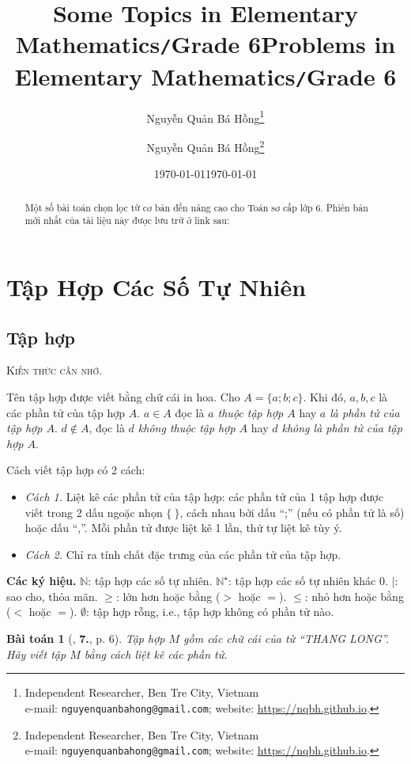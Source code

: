\documentclass{article}
\title{Some Topics in Elementary Mathematics\texttt{/}Grade 6}
\author{Nguyễn Quản Bá Hồng\footnote{Independent Researcher, Ben Tre City, Vietnam\\e-mail: \texttt{nguyenquanbahong@gmail.com}; website: \url{https://nqbh.github.io}.}}
\date{\today}
\title{Problems in Elementary Mathematics\texttt{/}Grade 6}
\author{Nguyễn Quản Bá Hồng\footnote{Independent Researcher, Ben Tre City, Vietnam\\e-mail: \texttt{nguyenquanbahong@gmail.com}; website: \url{https://nqbh.github.io}.}}
\date{\today}
\numberwithin{equation}{section}
\newtheorem{baitoan}{Bài toán}[section]
\begin{document}
\maketitle
\begin{abstract}
	Một số bài toán chọn lọc từ cơ bản đến nâng cao cho Toán sơ cấp lớp 6. Phiên bản mới nhất của tài liệu này được lưu trữ ở link sau: 
\end{abstract}

\tableofcontents
\newpage


\section{Tập Hợp Các Số Tự Nhiên}

\subsection{Tập hợp}
\textsc{Kiến thức cần nhớ.}
\begin{tcolorbox}	
	Tên tập hợp được viết bằng chữ cái in hoa. Cho $A = \{a;b;c\}$. Khi đó, $a,b,c$ là các phần tử của tập hợp $A$. $a\in A$ đọc là \textit{$a$ thuộc tập hợp $A$} hay \textit{$a$ là phần tử của tập hợp $A$}. $d\notin A$, đọc là \textit{$d$ không thuộc tập hợp $A$} hay \textit{$d$ không là phần tử của tập hợp $A$}.
	
	Cách viết tập hợp có 2 cách:
	\begin{itemize}
		\item \textit{Cách 1.} Liệt kê các phần tử của tập hợp: các phần tử của 1 tập hợp được viết trong 2 dấu ngoặc nhọn $\{\ \}$, cách nhau bởi dấu ``;'' (nếu có phần tử là số) hoặc dấu ``,''. Mỗi phần tử được liệt kê 1 lần, thứ tự liệt kê tùy ý.
		\item \textit{Cách 2.} Chỉ ra tính chất đặc trưng của các phần tử của tập hợp.
	\end{itemize}
	\textbf{Các ký hiệu.} $\mathbb{N}$: tập hợp các số tự nhiên. $\mathbb{N}^\star$: tập hợp các số tự nhiên khác $0$. $|$: sao cho, thỏa mãn. $\ge$: lớn hơn hoặc bằng ($>$ hoặc $=$). $\le$: nhỏ hơn hoặc bằng ($<$ hoặc $=$). $\emptyset$: tập hợp rỗng, i.e., tập hợp không có phần tử nào.
\end{tcolorbox}

\begin{baitoan}[\cite{Trong_Toan_6_2021}, \textbf{7.}, p. 6]
	Tập hợp $M$ gồm các chữ cái của từ ``THANG LONG''. Hãy viết tập $M$ bằng cách liệt kê các phần tử.
\end{baitoan}
\end{document}
